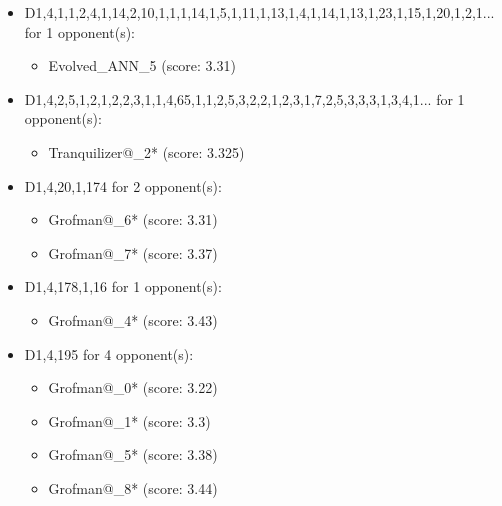 \begin{appendices}
\begin{itemize}
    \item D1,4,1,1,2,4,1,14,2,10,1,1,1,14,1,5,1,11,1,13,1,4,1,14,1,13,1,23,1,15,1,20,1,2,1... for 1 opponent(s):
    \begin{multicols}{3}
         \begin{itemize}
            \item Evolved\_ANN\_5 (score: 3.31)
        \end{itemize}
     \end{multicols}
     
    \item D1,4,2,5,1,2,1,2,2,3,1,1,4,65,1,1,2,5,3,2,2,1,2,3,1,7,2,5,3,3,3,1,3,4,1... for 1 opponent(s):
    \begin{multicols}{3}
         \begin{itemize}
            \item Tranquilizer@\_2* (score: 3.325)
        \end{itemize}
     \end{multicols}
     
    \item D1,4,20,1,174 for 2 opponent(s):
    \begin{multicols}{3}
         \begin{itemize}
            \item Grofman@\_6* (score: 3.31)
            \item Grofman@\_7* (score: 3.37)
        \end{itemize}
     \end{multicols}
     
    \item D1,4,178,1,16 for 1 opponent(s):
    \begin{multicols}{3}
         \begin{itemize}
            \item Grofman@\_4* (score: 3.43)
        \end{itemize}
     \end{multicols}
     
    \item D1,4,195 for 4 opponent(s):
    \begin{multicols}{3}
         \begin{itemize}
            \item Grofman@\_0* (score: 3.22)
            \item Grofman@\_1* (score: 3.3)
            \item Grofman@\_5* (score: 3.38)
            \item Grofman@\_8* (score: 3.44)
        \end{itemize}
     \end{multicols}
     

\end{itemize}
\end{appendices}
